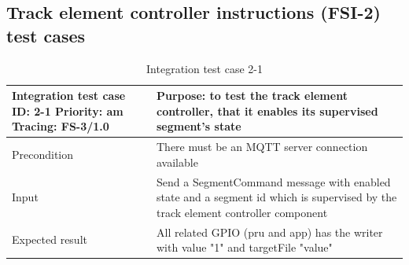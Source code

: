 \subsection{Track element controller instructions (FSI-2) test cases}
\begin{table}[H]
	\caption{Integration test case 2-1}
	\label{table:TCase-FSI2-1}
	\begin{center}
		\renewcommand{\arraystretch}{1.8}
		\begin{tabu} 
			to 0.9 \textwidth
			{  X[0.4, c] X[c] }
			\toprule
			Integration test case ID: 2-1 \newline Priority: am \newline Tracing: FS-3/1.0 & Purpose: to test the track element controller, that it enables its supervised segment's state                                   \\ \midrule
			Precondition                                                                   & There must be an MQTT server connection available                                                                               \\
			Input                                                                          & Send a SegmentCommand message with enabled state and a segment id which is supervised by the track element controller component \\
			Expected result                                                                & All related GPIO (pru and app) has the writer with value "1" and targetFile "value"                                             \\ \bottomrule
		\end{tabu}
	\end{center}
\end{table} 

